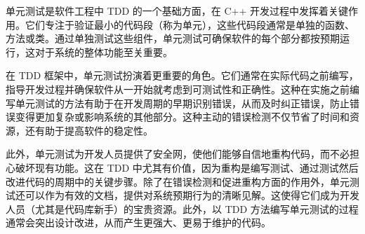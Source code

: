 单元测试是软件工程中 TDD 的一个基础方面，在 C++ 开发过程中发挥着关键作用。它们专注于验证最小的代码段（称为单元），这些代码段通常是单独的函数、方法或类。通过单独测试这些组件，单元测试可确保软件的每个部分都按预期运行，这对于系统的整体功能至关重要。

在 TDD 框架中，单元测试扮演着更重要的角色。它们通常在实际代码之前编写，指导开发过程并确保软件从一开始就考虑到可测试性和正确性。这种在实施之前编写单元测试的方法有助于在开发周期的早期识别错误，从而及时纠正错误，防止错误变得更加复杂或影响系统的其他部分。这种主动的错误检测不仅节省了时间和资源，还有助于提高软件的稳定性。

此外，单元测试为开发人员提供了安全网，使他们能够自信地重构代码，而不必担心破坏现有功能。这在 TDD 中尤其有价值，因为重构是编写测试、通过测试然后改进代码的周期中的关键步骤。除了在错误检测和促进重构方面的作用外，单元测试还可以作为有效的文档，提供对系统预期行为的清晰见解。这使得它们成为开发人员（尤其是代码库新手）的宝贵资源。此外，以 TDD 方法编写单元测试的过程通常会突出设计改进，从而产生更强大、更易于维护的代码。